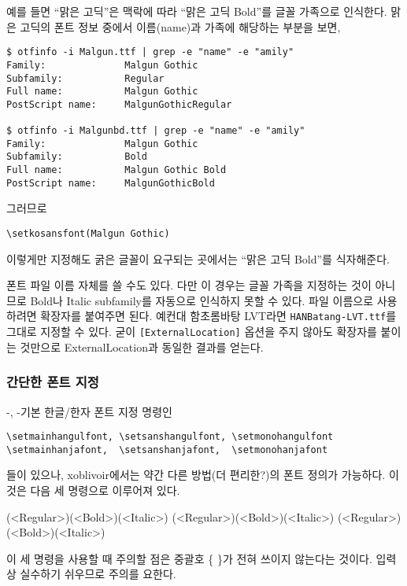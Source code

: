 \documentclass[
	12pt,
	a4paper,
	kosection,
	footnote,
	nobookmarks,
	microtype,
]{oblivoir}
\def\oblivoirdblquote#1{``#1''}
\newcommand\xobclass{x\-ob\-liv\-oir\oblivoirallowbreak}
\begin{document}
예를 들면
\oblivoirdblquote{맑은 고딕}은 맥락에 따라 \oblivoirdblquote{맑은 고딕 Bold}를
글꼴 가족으로 인식한다. 맑은 고딕의 폰트 정보 중에서 이름(name)과 가족에 해당하는 부분을 보면,
\begin{verbatim}
$ otfinfo -i Malgun.ttf | grep -e "name" -e "amily"
Family:              Malgun Gothic
Subfamily:           Regular
Full name:           Malgun Gothic
PostScript name:     MalgunGothicRegular

$ otfinfo -i Malgunbd.ttf | grep -e "name" -e "amily"
Family:              Malgun Gothic
Subfamily:           Bold
Full name:           Malgun Gothic Bold
PostScript name:     MalgunGothicBold
\end{verbatim}

그러므로
\begin{verbatim}
\setkosansfont(Malgun Gothic)
\end{verbatim}
이렇게만 지정해도 굵은 글꼴이 요구되는 곳에서는 \oblivoirdblquote{맑은 고딕 Bold}를
식자해준다.

폰트 파일 이름 자체를 쓸 수도 있다. 다만 이 경우는 글꼴 가족을 지정하는 것이 아니므로 Bold나 Italic subfamily를
자동으로 인식하지 못할 수 있다. 파일 이름으로 사용하려면 확장자를 붙여주면 된다. 예컨대 함초롬바탕 LVT라면
\texttt{HANBatang-LVT.ttf}를 그대로 지정할 수 있다. 굳이 \texttt{[ExternalLocation]} 옵션을 주지
않아도 확장자를 붙이는 것만으로 ExternalLocation과 동일한 결과를 얻는다.

\subsubsection{간단한 폰트 지정}

\XeTeX-\ko, \LuaTeX- 기본 한글/한자 폰트 지정 명령인
\begin{verbatim}
\setmainhangulfont, \setsanshangulfont, \setmonohangulfont
\setmainhanjafont,  \setsanshanjafont,  \setmonohanjafont
\end{verbatim}
들이 있으나, 
\xobclass 에서는 약간 다른 방법(더 편리한?)의 폰트 정의가
가능하다. 이것은 다음 세 명령으로 이루어져 있다.
\begin{boxedverbatim}
\setkomainfont[<basename>](<Regular>)(<Bold>)(<Italic>)
\setkosansfont[<basename>](<Regular>)(<Bold>)(<Italic>)
\setkomonofont[<basename>](<Regular>)(<Bold>)(<Italic>)
\end{boxedverbatim}

이 세 명령을 사용할 때 주의할 점은 중괄호 \{ \}가 전혀 쓰이지 않는다는 것이다.
입력상 실수하기 쉬우므로 주의를 요한다.
\end{document}
